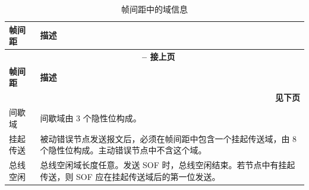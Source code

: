 \begin{longtable}[c]{|p{2.5cm}|p{13cm}|} 
  \caption{帧间距中的域信息}
  \label{tab:twai-interframe-space} 
  \\\hline
  \rowcolor{lightgray}
  \textbf{帧间距} & \textbf{描述}
  \\\hline
  \endfirsthead
  
  \multicolumn{2}{c}{\bfseries \tablename\ \thetable{} -- 接上页}\\  \hline
  
  \rowcolor{lightgray}
    \textbf{帧间距} & \textbf{描述}
  \\\hline
  \endhead
  
  \multicolumn{2}{r}{\textbf{见下页}} \\
  \endfoot
  \endlastfoot

    间歇域\label{table_item:ifg} & 间歇域由 3 个隐性位构成。
           \\\hline
    挂起传送 & 被动错误节点发送报文后，必须在帧间距中包含一个挂起传送域，由 8 个隐性位构成。主动错误节点中不含这个域。
            \\\hline
    总线空闲 & 总线空闲域长度任意。发送 SOF 时，总线空闲结束。若节点中有挂起传送，则 SOF 应在挂起传送域后的第一位发送。         
            \\\hline
    
\end{longtable}

